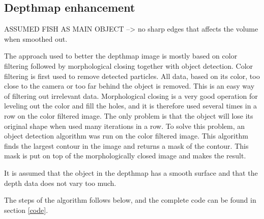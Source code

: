 

\subsection{Depthmap enhancement} \label{section:depthmap}


{\color{red}ASSUMED FISH AS MAIN OBJECT --> no sharp edges that affects the volume when smoothed out.}

The approach used to better the depthmap image is mostly based on color filtering followed by morphological closing together with object detection. 
Color filtering is first used to remove detected particles. All data, based on its color, too close to the camera or too far behind the object is removed. This is an easy way of filtering out irrelevant data. Morphological closing is a very good operation for leveling out the color and fill the holes, and it is therefore used several times in a row on the color filtered image. The only problem is that the object will lose its original shape when used many iterations in a row. To solve this problem, an object detection algorithm was run on the color filtered image. This algorithm finds the largest contour in the image and returns a mask of the contour. This mask is put on top of the morphologically closed image and makes the result.

It is assumed that the object in the depthmap has a smooth surface and that the depth data does not vary too much.

The steps of the algorithm follows below, and the complete code can be found in section \ref{code}.

